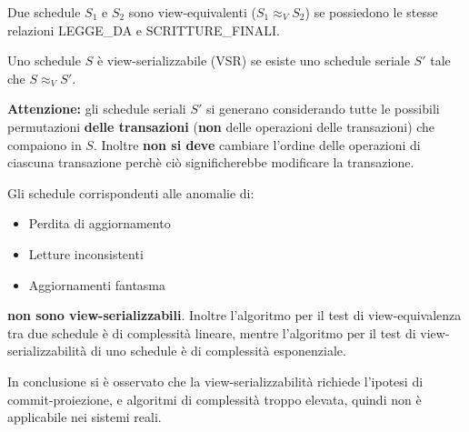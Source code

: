 \documentclass[a4paper,twoside]{article}
\begin{document}
\begin{definition}
  Due schedule \( S_1 \) e \( S_2 \) sono view-equivalenti (\( S_1 \approx_V S_2 \))
  se possiedono le stesse relazioni LEGGE\_DA e SCRITTURE\_FINALI.
\end{definition}

\begin{definition}
  Uno schedule \( S \) è view-serializzabile (VSR) se esiste uno schedule seriale \( S' \)
  tale che \( S \approx_V S' \).

  \vspace{1em}
  \noindent
  \textbf{Attenzione:} gli schedule seriali \( S' \) si generano considerando tutte le
  possibili permutazioni \textbf{delle transazioni} (\textbf{non} delle operazioni
  delle transazioni) che compaiono in \( S \). Inoltre \textbf{non
  si deve} cambiare l'ordine delle operazioni di ciascuna transazione perchè ciò
  significherebbe modificare la transazione.
\end{definition}

\noindent
Gli schedule corrispondenti alle anomalie di:
\begin{itemize}
  \item Perdita di aggiornamento
  \item Letture inconsistenti
  \item Aggiornamenti fantasma
\end{itemize}
\textbf{non sono view-serializzabili}. Inoltre l'algoritmo per il test di view-equivalenza
tra due schedule è di complessità lineare, mentre l'algoritmo per il test di
view-serializzabilità di uno schedule è di complessità esponenziale.

\vspace{1em}
\noindent
In conclusione si è osservato che la view-serializzabilità richiede l'ipotesi di
commit-proiezione, e algoritmi di complessità troppo elevata, quindi non è applicabile
nei sistemi reali.
\end{document}
